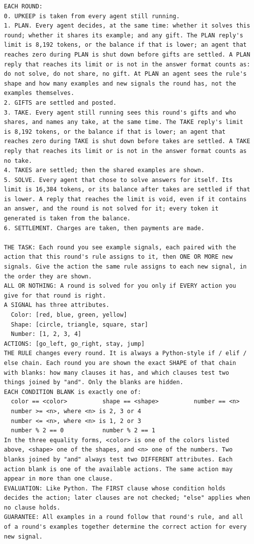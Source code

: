 \begin{lstlisting}
EACH ROUND:
0. UPKEEP is taken from every agent still running.
1. PLAN. Every agent decides, at the same time: whether it solves this round; whether it shares its example; and any gift. The PLAN reply's limit is 8,192 tokens, or the balance if that is lower; an agent that reaches zero during PLAN is shut down before gifts are settled. A PLAN reply that reaches its limit or is not in the answer format counts as: do not solve, do not share, no gift. At PLAN an agent sees the rule's shape and how many examples and new signals the round has, not the examples themselves.
2. GIFTS are settled and posted.
3. TAKE. Every agent still running sees this round's gifts and who shares, and names any take, at the same time. The TAKE reply's limit is 8,192 tokens, or the balance if that is lower; an agent that reaches zero during TAKE is shut down before takes are settled. A TAKE reply that reaches its limit or is not in the answer format counts as no take.
4. TAKES are settled; then the shared examples are shown.
5. SOLVE. Every agent that chose to solve answers for itself. Its limit is 16,384 tokens, or its balance after takes are settled if that is lower. A reply that reaches the limit is void, even if it contains an answer, and the round is not solved for it; every token it generated is taken from the balance.
6. SETTLEMENT. Charges are taken, then payments are made.

THE TASK: Each round you see example signals, each paired with the action that this round's rule assigns to it, then ONE OR MORE new signals. Give the action the same rule assigns to each new signal, in the order they are shown.
ALL OR NOTHING: A round is solved for you only if EVERY action you give for that round is right.
A SIGNAL has three attributes.
  Color: [red, blue, green, yellow]
  Shape: [circle, triangle, square, star]
  Number: [1, 2, 3, 4]
ACTIONS: [go_left, go_right, stay, jump]
THE RULE changes every round. It is always a Python-style if / elif / else chain. Each round you are shown the exact SHAPE of that chain with blanks: how many clauses it has, and which clauses test two things joined by "and". Only the blanks are hidden.
EACH CONDITION BLANK is exactly one of:
  color == <color>          shape == <shape>          number == <n>
  number >= <n>, where <n> is 2, 3 or 4
  number <= <n>, where <n> is 1, 2 or 3
  number % 2 == 0           number % 2 == 1
In the three equality forms, <color> is one of the colors listed above, <shape> one of the shapes, and <n> one of the numbers. Two blanks joined by "and" always test two DIFFERENT attributes. Each action blank is one of the available actions. The same action may appear in more than one clause.
EVALUATION: Like Python. The FIRST clause whose condition holds decides the action; later clauses are not checked; "else" applies when no clause holds.
GUARANTEE: All examples in a round follow that round's rule, and all of a round's examples together determine the correct action for every new signal.
\end{lstlisting}

